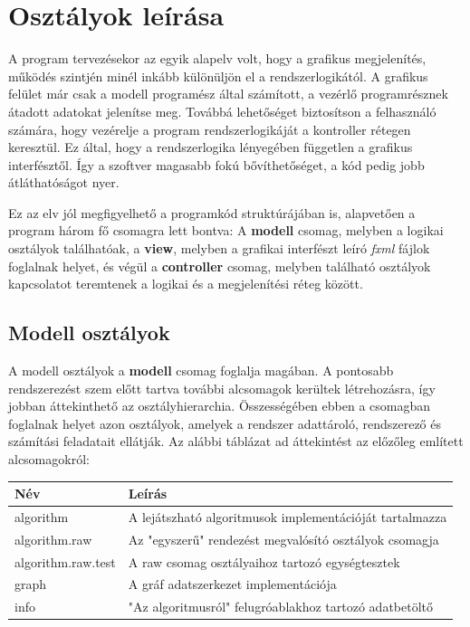 \documentclass{elteikthesis}
\begin{document}
\section{Osztályok leírása}
A program tervezésekor az egyik alapelv volt, hogy a grafikus megjelenítés, működés szintjén minél inkább különüljön el a rendszerlogikától. A grafikus felület már csak a modell programész által számított, a vezérlő programrésznek átadott adatokat jelenítse meg. Továbbá lehetőséget biztosítson a felhasználó számára, hogy vezérelje a program rendszerlogikáját a kontroller rétegen keresztül. Ez által, hogy a rendszerlogika lényegében független a grafikus interfésztől. Így a szoftver magasabb fokú bővíthetőséget, a kód pedig jobb átláthatóságot nyer.\par
Ez az elv jól megfigyelhető a programkód struktúrájában is, alapvetően a program három fő csomagra lett bontva: A \textbf{modell} csomag, melyben a logikai osztályok találhatóak, a \textbf{view}, melyben a grafikai interfészt leíró \emph{fxml} fájlok foglalnak helyet, és végül a \textbf{controller} csomag, melyben található osztályok kapcsolatot teremtenek a logikai és a megjelenítési réteg között.

\subsection{Modell osztályok}
A modell osztályok a \textbf{modell} csomag foglalja magában. A pontosabb rendszerezést szem előtt tartva további alcsomagok kerültek létrehozásra, így jobban áttekinthető az osztályhierarchia. Összességében ebben a csomagban foglalnak helyet azon osztályok, amelyek a rendszer adattároló, rendszerező és számítási feladatait ellátják. Az alábbi táblázat ad áttekintést az előzőleg említett alcsomagokról:\par
\begin{table}[h]
		\def\arraystretch{2}
		\centering
	\begin{tabular}{|l|l|}
		\hline
		\textbf{Név}  & \textbf{Leírás}                                                                          \\ \hline
		algorithm     & A lejátszható algoritmusok implementációját tartalmazza                       \\ \hline
		algorithm.raw & Az "egyszerű" rendezést megvalósító osztályok csomagja\\ \hline
		algorithm.raw.test & A raw csomag osztályaihoz tartozó egységtesztek\\ \hline
		graph         & A gráf adatszerkezet implementációja                           \\ \hline
		info         & "Az algoritmusról" felugróablakhoz tartozó adatbetöltő                         \\ \hline
	\end{tabular}
\end{table}
\end{document}
